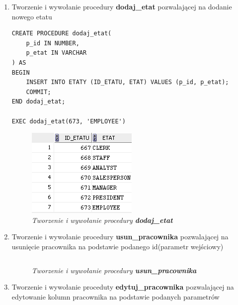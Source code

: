 \documentclass{article}
\begin{document}
\begin{enumerate}
\item Tworzenie i wywołanie procedury \textbf{dodaj\_etat} pozwalającej na dodanie nowego etatu

\begin{lstlisting}[style=SQL, caption=\textit{Tworzenie i wywołanie procedury \textbf{dodaj\_etat}}]
CREATE PROCEDURE dodaj_etat(
	p_id IN NUMBER,
	p_etat IN VARCHAR
) AS
BEGIN
	INSERT INTO ETATY (ID_ETATU, ETAT) VALUES (p_id, p_etat);
	COMMIT;
END dodaj_etat;

EXEC dodaj_etat(673, 'EMPLOYEE')
\end{lstlisting}

		\begin{figure}[H]
			\centering
			\includegraphics[scale=1.2]{zadanie1.png}
			\caption{\textit{Tworzenie i wywołanie procedury \textbf{dodaj\_etat}}}
		\end{figure}

\item Tworzenie i wywołanie procedury \textbf{usun\_pracownika} pozwalającej na usunięcie pracownika na podstawie podanego id(parametr wejściowy)

	\begin{lstlisting}[style=SQL, caption=\textit{Tworzenie i wywołanie procedury \textbf{usun\_pracownika}}]
	\end{lstlisting}

		\begin{figure}[H]
			\centering
			\caption{\textit{Tworzenie i wywołanie procedury \textbf{usun\_pracownika}}}
		\end{figure}

\item Tworzenie i wywołanie proceduty \textbf{edytuj\_pracownika} pozwalającej na edytowanie kolumn pracownika na podstawie podanych parametrów

	\begin{lstlisting}[style=SQL, caption=\textit{Tworzenie i wywołanie procedury \textbf{edytuj\_pracownika}}]
	\end{lstlisting}


\end{enumerate}
\end{document}
